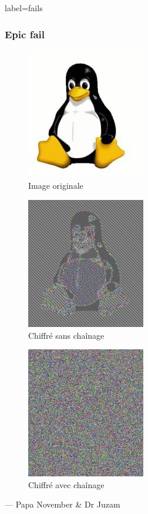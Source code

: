\documentclass{beamer}
\begin{document}
        \begin{frame}{label=fails}
            \frametitle{Epic fail}
            \begin{center}
                \begin{figure}
                    \includegraphics[scale=0.15]{img/plain.jpg}
                    \caption{Image originale}
                \end{figure}
                \pause
                \begin{figure}
                    \includegraphics[scale=0.15]{img/aes_no_chain.jpg}
                    \caption{Chiffré sans chaînage}
                \end{figure}
                \pause
                \begin{figure}
                    \includegraphics[scale=0.15]{img/aes_chain.jpg}
                    \caption{Chiffré avec chaînage}
                \end{figure}
                \cc --- Papa November \& Dr Juzam
            \end{center}
        \end{frame}
        \appendix
        \begin{frame}
            {}
            
        \end{frame}
\end{document}
